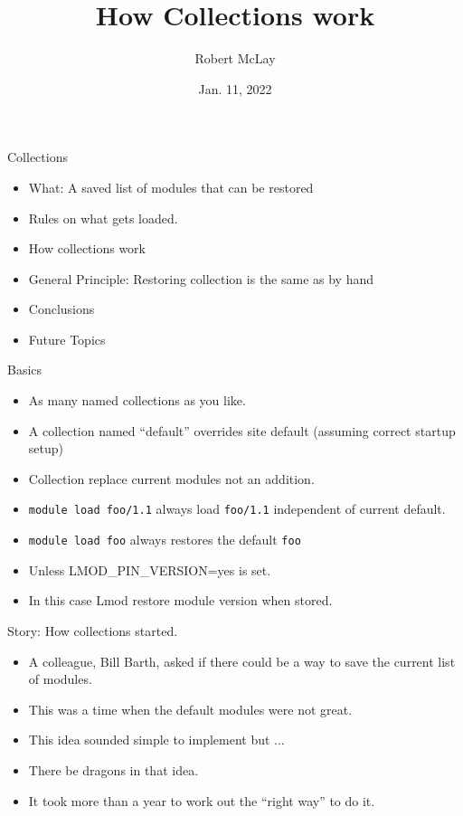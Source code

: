 \documentclass{beamer}
\begin{document}
\title[Lmod]{How Collections work}
\author{Robert McLay} 
\date{Jan. 11, 2022}

\frame{\titlepage} 


\begin{frame}{Collections}
  \begin{itemize}
    \item What: A saved list of modules that can be restored
    \item Rules on what gets loaded.
    \item How collections work
    \item General Principle: Restoring collection is the same as by hand
    \item Conclusions
    \item Future Topics
  \end{itemize}
\end{frame}

\begin{frame}{Basics}
  \begin{itemize}
    \item As many named collections as you like.
    \item A collection named ``default'' overrides site default
      (assuming correct startup setup)
    \item Collection replace current modules not an addition.
    \item \texttt{module load foo/1.1} always load \texttt{foo/1.1}
      independent of current default.
    \item \texttt{module load foo} always restores the default
      \texttt{foo}
    \item Unless LMOD_PIN_VERSION=yes is set. 
    \item In this case Lmod restore module version when stored.
  \end{itemize}
\end{frame}


\begin{frame}{Story: How collections started.}
  \begin{itemize}
    \item A colleague, Bill Barth, asked if there could be a way to
      save the current list of modules.
    \item This was a time when the default modules were not great.
    \item This idea sounded simple to implement but ...
    \item There be dragons in that idea.
    \item It took more than a year to work out the ``right way'' to do it.
  \end{itemize}
\end{frame}
\end{document}

